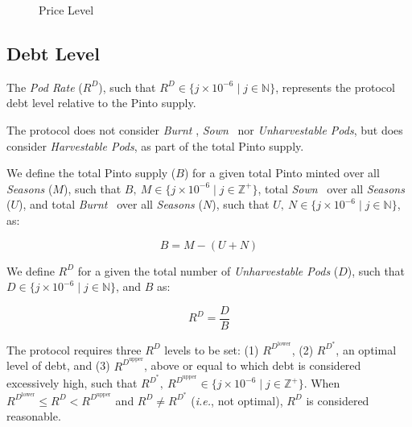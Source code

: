 \documentclass[tikz]{article}
\newcommand{\term}[1]{\textsl{#1}}
\newcommand{\Pinto}{} %
\begin{document}

\begin{figure}[h!]
    \centering
    
    \vspace*{-7mm}
    \setlength{\belowcaptionskip}{-8pt} %
    \caption{Price Level}
    \label{Price Level}
\end{figure}


\subsection{Debt Level}

The \term{Pod Rate} ($R^{D}$), such that $R^{D} \in \{j \times 10^{-6} \mid j \in \mathbb{N} \}$, represents the protocol debt level relative to the Pinto supply.

The protocol does not consider \term{Burnt} \Pinto, \term{Sown} \Pinto\  nor \term{Unharvestable Pods}, but does consider \term{Harvestable Pods}, as part of the total Pinto supply.

We define the total Pinto supply ($B$) for a given total Pinto minted over all \term{Seasons} ($M$), such that $B,\ M \in \{j \times 10^{-6} \mid j \in \mathbb{Z}^{+} \}$, total \term{Sown} \Pinto\ over all \term{Seasons} ($U$), and total \term{Burnt} \Pinto\ over all \term{Seasons} ($N$), such that $U,\ N \in \{j \times 10^{-6} \mid j \in \mathbb{N} \}$, as:

    $$
        B = M - (U + N)
    $$

We define $R^{D}$ for a given the total number of \term{Unharvestable Pods} ($D$), such that $D \in \{j \times 10^{-6} \mid j \in \mathbb{N} \}$, and $B$ as:

    $$
        R^{D} = \frac{D}{B}
    $$

\newpage

The protocol requires three $R^{D}$ levels to be set: (1) $R^{D^{\text{lower}}}$, (2) $R^{D^{*}}$, an optimal level of debt, and (3) $R^{D^{\text{upper}}}$, above or equal to which debt is considered excessively high, such that $R^{D^{*}},\ R^{D^{\text{upper}}} \in \{j \times 10^{-6} \mid j \in \mathbb{Z}^{+} \}$. When $R^{D^{\text{lower}}} \leq R^{D} < R^{D^{\text{upper}}}$ and $R^{D} \neq R^{D^{*}}$ (\textit{i.e.}, not optimal), $R^{D}$ is considered reasonable.

\end{document}

